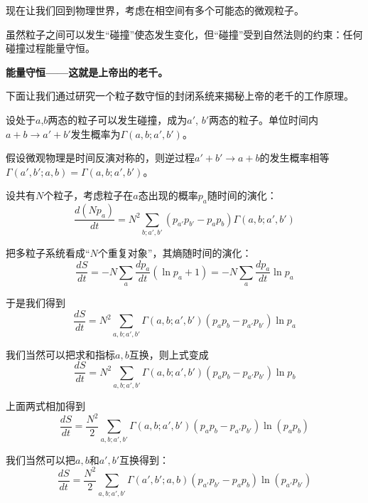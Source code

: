 \documentclass[CJK]{beamer}
\begin{document}
\begin{frame}
\bch
{\small
现在让我们回到物理世界，考虑在相空间有多个可能态的微观粒子。

\skipline

虽然粒子之间可以发生“碰撞”使态发生变化，但“碰撞”受到自然法则的约束：任何碰撞过程能量守恒。

\skiplines

{\blue \bf 能量守恒——这就是上帝出的老千。}
}

\skiplines

下面让我们通过研究一个粒子数守恒的封闭系统来揭秘上帝的老千的工作原理。
\ech
\end{frame}

\begin{frame}
\bch
{\small
\bitem
\item{设处于$a$,$b$两态的粒子可以发生碰撞，成为$a'$, $b'$两态的粒子。单位时间内$a+b\rightarrow a'+b'$发生概率为$\Gamma(a, b; a', b')$。}
\item{{\blue 假设微观物理是时间反演对称的}，则逆过程$a'+b'\rightarrow a+b$的发生概率相等$\Gamma(a', b'; a, b) = \Gamma(a, b; a', b')$。}
\item{设共有$N$个粒子，考虑粒子在$a$态出现的概率$p_a$随时间的演化：
$$\frac{d (Np_a)}{dt} = N^2\sum_{b;a',b'} (p_{a'}p_{b'}  -  p_a p_b) \Gamma(a, b; a', b')$$
}
\item{把多粒子系统看成“$N$个重复对象”，其熵随时间的演化：
$$\frac{d S}{dt} = -N\sum_a\frac{dp_a}{dt}(\ln p_a+1) = -N\sum_a\frac{dp_a}{dt}\ln p_a  $$
}
\eitem
}
\ech
\end{frame}

\begin{frame}
\bch
{\small
\bitem
\item{于是我们得到
$$\frac{d S}{dt} =  N^2 \sum_{a, b; a', b'}\Gamma(a, b; a', b') \left(p_ap_b - p_{a'}p_{b'}\right)\ln p_a    $$
}
\item{我们当然可以把求和指标$a, b$互换，则上式变成
$$\frac{d S}{dt} =  N^2 \sum_{a, b; a', b'}\Gamma(a, b; a', b') \left(p_ap_b - p_{a'}p_{b'}\right)\ln p_b    $$
}
\item{上面两式相加得到
$$\frac{d S}{dt} =  \frac{N^2}{2} \sum_{a, b; a', b'}\Gamma(a, b; a', b') \left(p_ap_b - p_{a'}p_{b'}\right)\ln(p_ap_b)    $$
}
\item{我们当然可以把$a,b$和$a',b'$互换得到：
$$\frac{d S}{dt} =  \frac{N^2}{2} \sum_{a, b; a', b'}\Gamma(a', b'; a, b) \left(p_{a'}p_{b'} - p_ap_b\right)\ln(p_{a'}p_{b'})    $$
}

\eitem
}
\ech
\end{frame}
\end{document}
